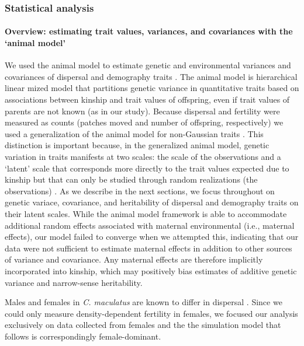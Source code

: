 \subsubsection{Statistical analysis}
\paragraph{Overview: estimating trait values, variances, and covariances with the `animal model'}
We used the animal model to estimate genetic and environmental variances and covariances of dispersal and demography traits \citep{lynch_genetics_1998,kruuk_estimating_2004,wilson_ecologists_2010}. The animal model is hierarchical linear mized model that partitions genetic variance in quantitative traits based on associations between kinship and trait values of offspring, even if trait values of parents are not known (as in our study). Because dispersal and fertility were measured as counts (patches moved and number of offspring, respectively) we used a generalization of the animal model for non-Gaussian traits \citep{de2016general}. This distinction is important because, in the generalized animal model, genetic variation in traits manifests at two scales: the scale of the observations and a `latent' scale that corresponds more directly to the trait values expected due to kinship but that can only be studied through random realizations (the observations) \citep{de2016general}. As we describe in the next sections, we focus throughout on genetic variace, covariance, and heritability of dispersal and demography traits on their latent scales. While the animal model framework is able to accommodate additional random effects associated with maternal environmental (i.e., maternal effects), our model failed to converge when we attempted this, indicating that our data were not sufficient to estimate maternal effects in addition to other sources of variance and covariance. Any maternal effects are therefore implicitly incorporated into kinship, which may positively bias estimates of additive genetic variance and narrow-sense heritability. 

Males and females in \textit{C. maculatus} are known to differ in dispersal \citep{miller_sex_2013,ochocki_rapid_2017}. Since we could only measure density-dependent fertility in females, we focused our analysis exclusively on data collected from females and the the simulation model that follows is correspondingly female-dominant. 


